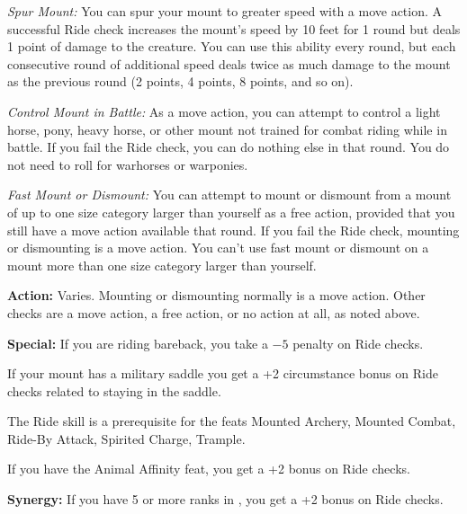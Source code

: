 \textit{Spur Mount:} You can spur your mount to greater speed with a move action. A successful Ride check increases the mount's speed by 10 feet for 1 round but deals 1 point of damage to the creature. You can use this ability every round, but each consecutive round of additional speed deals twice as much damage to the mount as the previous round (2 points, 4 points, 8 points, and so on).

\textit{Control Mount in Battle:} As a move action, you can attempt to control a light horse, pony, heavy horse, or other mount not trained for combat riding while in battle. If you fail the Ride check, you can do nothing else in that round. You do not need to roll for warhorses or warponies.

\textit{Fast Mount or Dismount:} You can attempt to mount or dismount from a mount of up to one size category larger than yourself as a free action, provided that you still have a move action available that round. If you fail the Ride check, mounting or dismounting is a move action. You can't use fast mount or dismount on a mount more than one size category larger than yourself.

\textbf{Action:} Varies. Mounting or dismounting normally is a move action. Other checks are a move action, a free action, or no action at all, as noted above.

\textbf{Special:} If you are riding bareback, you take a $-5$ penalty on Ride checks.

If your mount has a military saddle you get a +2 circumstance bonus on Ride checks related to staying in the saddle.

The Ride skill is a prerequisite for the feats Mounted Archery, Mounted Combat, Ride-By Attack, Spirited Charge, Trample.

If you have the Animal Affinity feat, you get a +2 bonus on Ride checks.

\textbf{Synergy:} If you have 5 or more ranks in , you get a +2 bonus on Ride checks.

